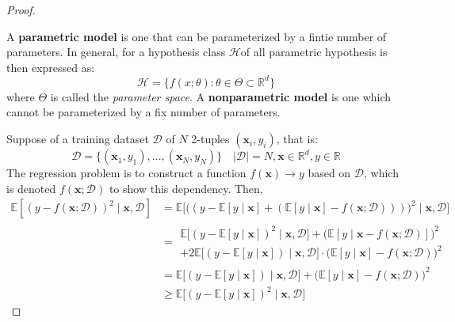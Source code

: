\documentclass[twoside,10pt]{article}
\begin{document}
\begin{proof}
    \begin{definition}[Parameterization]
        A \textbf{parametric model} is one that can be parameterized by a fintie number of parameters. In general, for a hypothesis class $\mathcal{H}$of all parametric hypothesis is then expressed as:
        \begin{equation}
            \mathcal{H} = \{f(x;\theta): \theta \in \Theta \subset \mathbb{R}^{d}\}
        \end{equation} where $\Theta$ is called the \textit{parameter space}. A \textbf{nonparametric model} is one which cannot be parameterized by a fix number of parameters.   
    \end{definition}
    Suppose of a training dataset $\mathcal{D}$ of $N$ 2-tuples $(\mathbf{x}_{i},y_{i})$, that is: \begin{equation}
        \mathcal{D} = \{(\mathbf{x}_{1},y_{1}),\dots,(\mathbf{x}_{N},y_{N})\} \quad \lvert \mathcal{D} \rvert = N, \mathbf{x}\in \mathbb{R}^{d}, y \in \mathbb{R}
    \end{equation}
    The regression problem is to construct a function $f(\mathbf{x})\to y$ based on $\mathcal{D}$, which is denoted $f(\mathbf{x};\mathcal{D})$ to show this dependency. Then, 
    \begin{equation}
        \begin{split}
            \mathbb{E}\left[ (y-f(\mathbf{x};\mathcal{D}))^{2}\mid \mathbf{x},\mathcal{D}\right] & = \mathbb{E}\Big[\big( (y-\mathbb{E}[y\mid \mathbf{x}]+ (\mathbb{E}[y\mid \mathbf{x}]-f(\mathbf{x};\mathcal{D}))) \big)^{2}\mid \mathbf{x},\mathcal{D}\Big]\\
            & = \begin{multlined}
                \mathbb{E} \Big[ (y- \mathbb{E}[y\mid \mathbf{x}])^{2}\mid \mathbf{x},\mathcal{D} \Big] + \Big(\mathbb{E}[y\mid \mathbf{x}-f(\mathbf{x};\mathcal{D})]\Big)^{2} \\ + 2\mathbb{E} \big[(y-\mathbb{E}[y\mid \mathbf{x}])\mid \mathbf{x},\mathcal{D}\big]\cdot \big(\mathbb{E}[y\mid \mathbf{x}]-f(\mathbf{x;\mathcal{D}})\big)^{2} 
            \end{multlined} \\
            & = \mathbb{E} \Big[(y-\mathbb{E}[y\mid \mathbf{x}])\mid \mathbf{x},\mathcal{D}\Big] + \big(\mathbb{E}[y\mid \mathbf{x}]-f(\mathbf{x};\mathcal{D})\big)^{2}\\
            & \geq \mathbb{E} \big[(y-\mathbb{E}[y\mid \mathbf{x}])^{2}\mid \mathbf{x},\mathcal{D}\big]
        \end{split}

\end{equation}
\end{proof}
\end{document}
